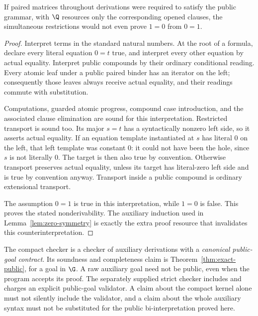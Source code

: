 \begin{proposition}
If paired matrices throughout derivations were required to satisfy the
public grammar, with $\Q$ resources only the corresponding opened
clauses, the simultaneous restrictions would not even prove $1=0$ from
$0=1$.
\end{proposition}
\begin{proof}
Interpret terms in the standard natural numbers.  At the root of a
formula, declare every literal equation $0=t$ true, and interpret every
other equation by actual equality.  Interpret public compounds by their
ordinary conditional reading.  Every atomic leaf under a public paired
binder has an iterator on the left; consequently those leaves always
receive actual equality, and their readings commute with substitution.

Computations, guarded atomic progress, compound case introduction,
and the associated clause elimination are sound for this interpretation.
Restricted transport is sound too.  Its major $s=t$ has a syntactically
nonzero left side, so it asserts actual equality.  If an equation
template instantiated at $s$ has literal $0$ on the left, that left
template was constant $0$: it could not have been the hole, since
$s$ is not literally $0$.  The target is then also true by convention.
Otherwise transport preserves actual equality, unless its target has
literal-zero left side and is true by convention anyway.  Transport
inside a public compound is ordinary extensional transport.

The assumption $0=1$ is true in this interpretation, while $1=0$ is
false.  This proves the stated nonderivability.  The auxiliary induction
used in Lemma~\ref{lem:zero-symmetry} is exactly the extra proof resource
that invalidates this counterinterpretation.
\end{proof}

\begin{remark}
The compact checker is a checker of auxiliary derivations with a
\emph{canonical public-goal contract}.  Its soundness and completeness
claim is Theorem~\ref{thm:exact-public}, for a goal in $\G$.  A raw
auxiliary goal need not be public, even when the program accepts its
proof.  The separately supplied strict checker includes and charges an
explicit public-goal validator.  A claim about the compact kernel alone
must not silently include the validator, and a claim about the whole
auxiliary syntax must not be substituted for the public bi-interpretation
proved here.
\end{remark}
